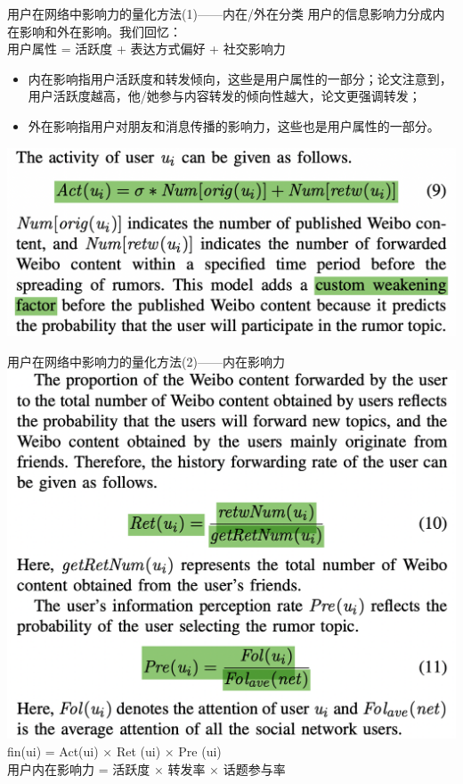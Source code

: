 \documentclass{beamer}
\begin{document}
\begin{frame}{用户在网络中影响力的量化方法(1)——内在/外在分类}
	用户的信息影响力分成内在影响和外在影响。我们回忆：\\
	用户属性 = 活跃度 + 表达方式偏好 + 社交影响力
	\begin{itemize}
		\item 内在影响指用户活跃度和转发倾向，这些是用户属性的一部分；论文注意到，用户活跃度越高，他/她参与内容转发的倾向性越大，论文更强调转发；
		\item 外在影响指用户对朋友和消息传播的影响力，这些也是用户属性的一部分。
	\end{itemize}
	\includegraphics[width=0.6\linewidth]{Assets/Act.png}
\end{frame}

\begin{frame}{用户在网络中影响力的量化方法(2)——内在影响力}
	\includegraphics[width=0.8\linewidth]{Assets/内在影响.png}\\
	fin(ui) = Act(ui) × Ret (ui) × Pre (ui)\\
	用户内在影响力 = 活跃度 × 转发率 × 话题参与率
\end{frame}
\end{document}
